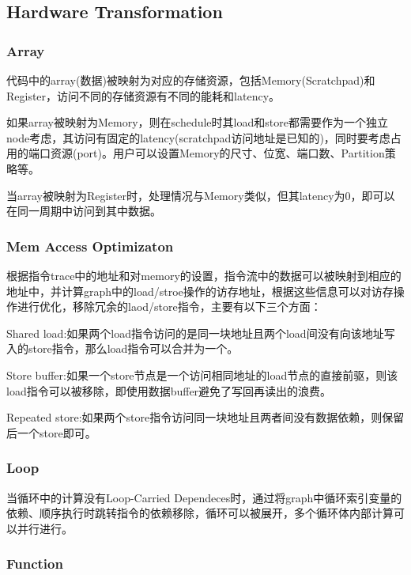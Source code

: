 \documentclass[UTF8]{scrartcl}
\begin{document}
	\subsection{Hardware Transformation}
		
		
		
		\subsubsection{Array}
		
			代码中的array(数据)被映射为对应的存储资源，包括Memory(Scratchpad)和Register，访问不同的存储资源有不同的能耗和latency。
			
			如果array被映射为Memory，则在schedule时其load和store都需要作为一个独立node考虑，其访问有固定的latency(scratchpad访问地址是已知的)，同时要考虑占用的端口资源(port)。用户可以设置Memory的尺寸、位宽、端口数、Partition策略等。
			
			当array被映射为Register时，处理情况与Memory类似，但其latency为0，即可以在同一周期中访问到其中数据。
		
		
		\subsubsection{Mem Access Optimizaton}
			
			根据指令trace中的地址和对memory的设置，指令流中的数据可以被映射到相应的地址中，并计算graph中的load/stroe操作的访存地址，根据这些信息可以对访存操作进行优化，移除冗余的laod/store指令，主要有以下三个方面：
			
			Shared load:如果两个load指令访问的是同一块地址且两个load间没有向该地址写入的store指令，那么load指令可以合并为一个。
			
			Store buffer:如果一个store节点是一个访问相同地址的load节点的直接前驱，则该load指令可以被移除，即使用数据buffer避免了写回再读出的浪费。
			
			Repeated store:如果两个store指令访问同一块地址且两者间没有数据依赖，则保留后一个store即可。
			
		\subsubsection{Loop}
		
			当循环中的计算没有Loop-Carried Dependeces时，通过将graph中循环索引变量的依赖、顺序执行时跳转指令的依赖移除，循环可以被展开，多个循环体内部计算可以并行进行。
		
		\subsubsection{Function}
			
\end{document}
